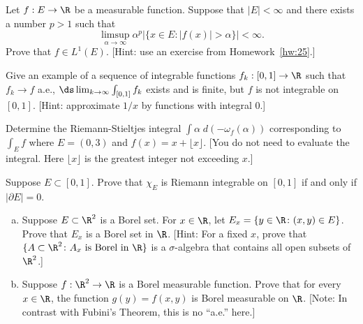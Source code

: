 \begin{hw} \label{hw:33}
Let $f: E \to \R$ be a measurable function. Suppose that $|E| < \infty$ and there exists a number $p > 1$ such that 
        \[
        \limsup_{\alpha \to \infty} \alpha^p |\{ x \in E \colon |f(x)| > \alpha \}| < \infty.
        \]
Prove that $f\in L^1(E)$. [Hint: use an exercise from Homework~\ref{hw:25}.] \\
\end{hw}


\begin{hw} \label{hw:34}
Give an example of a sequence of integrable functions $f_k: [0, 1] \to \R$ such that $f_k \to f$ a.e., $\ds\lim_{k \to \infty} \int_{[0,1]} f_k $ exists and is finite, but $f$ is not integrable on $[0, 1]$. [Hint: approximate $1/x$ by functions with integral $0$.] \\
\end{hw}






\begin{hw} \label{hw:35}
Determine the Riemann-Stieltjes integral $\int \alpha \; d(-\omega_f(\alpha))$ corresponding to $\int_E f$ where $E= (0, 3)$ and $f(x)= x + \lfloor x \rfloor $. [You do not need to evaluate the integral. Here $\lfloor x \rfloor$ is the greatest integer not exceeding $x$.] \\
\end{hw}


\begin{hw} \label{hw:36}
Suppose $E \subset [0, 1]$. Prove that $\chi_E$ is Riemann integrable on $[0, 1]$ if and only if $|\partial E|=0$. \\
\end{hw}






\begin{hw} \label{hw:37} \hfill
\begin{enumerate}[(a)]
\item Suppose $E \subset \R^2$ is a Borel set. For $x \in \R$, let $E_x = \{y \in \R \colon (x, y) \in E \}$. Prove that $E_x$ is a Borel set in $\R$. [Hint: For a fixed $x$, prove that $\{ A \subset \R^2 \colon A_x \text{ is Borel in } \R \}$ is a $\sigma$-algebra that contains all open subsets of $\R^2$.]
\item Suppose $f: \R^{2} \to \R$ is a Borel measurable function. Prove that for every $x \in \R$, the function $g(y)= f(x, y)$ is Borel measurable on $\R$. [Note: In contrast with Fubini's Theorem, this is no ``a.e.'' here.] \\
\end{enumerate} 
\end{hw}


